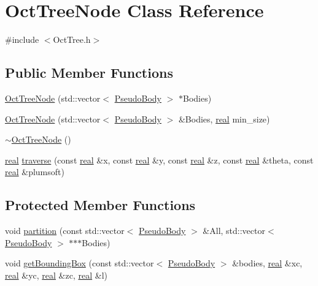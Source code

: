 \section{OctTreeNode Class Reference}
\label{classOctTreeNode}


{\ttfamily \#include $<$OctTree.h$>$}

\subsection*{Public Member Functions}
\begin{DoxyCompactItemize}
\item 
\hyperlink{classOctTreeNode_a103c388aea6f83cce81b8d7433b8982c}{OctTreeNode} (std::vector$<$ \hyperlink{classPseudoBody}{PseudoBody} $>$ $\ast$Bodies)
\item 
\hyperlink{classOctTreeNode_a1bfe8b77ca90832454010d5e1a06aec0}{OctTreeNode} (std::vector$<$ \hyperlink{classPseudoBody}{PseudoBody} $>$ \&Bodies, \hyperlink{Global_8h_a031f8951175b43076c2084a6c2173410}{real} min\_\-size)
\item 
\hyperlink{classOctTreeNode_a6d6f8ebcf5b873195ea89ae4c0597fab}{$\sim$OctTreeNode} ()
\item 
\hyperlink{Global_8h_a031f8951175b43076c2084a6c2173410}{real} \hyperlink{classOctTreeNode_a0e30d64e4e7e5d525ff57656b9f570b0}{traverse} (const \hyperlink{Global_8h_a031f8951175b43076c2084a6c2173410}{real} \&x, const \hyperlink{Global_8h_a031f8951175b43076c2084a6c2173410}{real} \&y, const \hyperlink{Global_8h_a031f8951175b43076c2084a6c2173410}{real} \&z, const \hyperlink{Global_8h_a031f8951175b43076c2084a6c2173410}{real} \&theta, const \hyperlink{Global_8h_a031f8951175b43076c2084a6c2173410}{real} \&plumsoft)
\end{DoxyCompactItemize}
\subsection*{Protected Member Functions}
\begin{DoxyCompactItemize}
\item 
void \hyperlink{classOctTreeNode_a5ad5e6ccfc85d5c027dc7d64fc87c5c2}{partition} (const std::vector$<$ \hyperlink{classPseudoBody}{PseudoBody} $>$ \&All, std::vector$<$ \hyperlink{classPseudoBody}{PseudoBody} $>$ $\ast$$\ast$$\ast$Bodies)
\item 
void \hyperlink{classOctTreeNode_a8a0338ba7c40a65744ed5bfec17bd80c}{getBoundingBox} (const std::vector$<$ \hyperlink{classPseudoBody}{PseudoBody} $>$ \&bodies, \hyperlink{Global_8h_a031f8951175b43076c2084a6c2173410}{real} \&xc, \hyperlink{Global_8h_a031f8951175b43076c2084a6c2173410}{real} \&yc, \hyperlink{Global_8h_a031f8951175b43076c2084a6c2173410}{real} \&zc, \hyperlink{Global_8h_a031f8951175b43076c2084a6c2173410}{real} \&l)
\end{DoxyCompactItemize}
